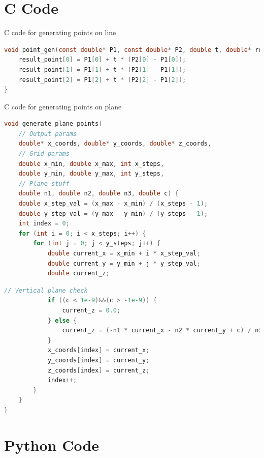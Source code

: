 \documentclass{beamer}
\theoremstyle{remark}
\numberwithin{equation}{section}
\begin{document}
\section{C Code}
\begin{frame}[fragile]{C code for generating points on line}
\begin{lstlisting}[language=C]
 void point_gen(const double* P1, const double* P2, double t, double* result_point) {
    result_point[0] = P1[0] + t * (P2[0] - P1[0]);
    result_point[1] = P1[1] + t * (P2[1] - P1[1]);
    result_point[2] = P1[2] + t * (P2[2] - P1[2]);
}
\end{lstlisting}
\end{frame}

\begin{frame}[fragile]{C code for generating points on plane}
\begin{lstlisting}[language=C]
 void generate_plane_points(
    // Output params
    double* x_coords, double* y_coords, double* z_coords,
    // Grid params
    double x_min, double x_max, int x_steps,
    double y_min, double y_max, int y_steps,
    // Plane stuff
    double n1, double n2, double n3, double c) {
    double x_step_val = (x_max - x_min) / (x_steps - 1);
    double y_step_val = (y_max - y_min) / (y_steps - 1);
    int index = 0;
    for (int i = 0; i < x_steps; i++) {
        for (int j = 0; j < y_steps; j++) {
            double current_x = x_min + i * x_step_val;
            double current_y = y_min + j * y_step_val;
            double current_z;
\end{lstlisting}
\end{frame}
\begin{frame}[fragile]
 \begin{lstlisting}[language=C]
            // Vertical plane check
            if ((c < 1e-9)&&(c > -1e-9)) {
                current_z = 0.0;
            } else {
                current_z = (-n1 * current_x - n2 * current_y + c) / n3;
            }
            x_coords[index] = current_x;
            y_coords[index] = current_y;
            z_coords[index] = current_z;
            index++;
        }
    }
}
 \end{lstlisting}
\end{frame}

\section{Python Code}
\end{document}
